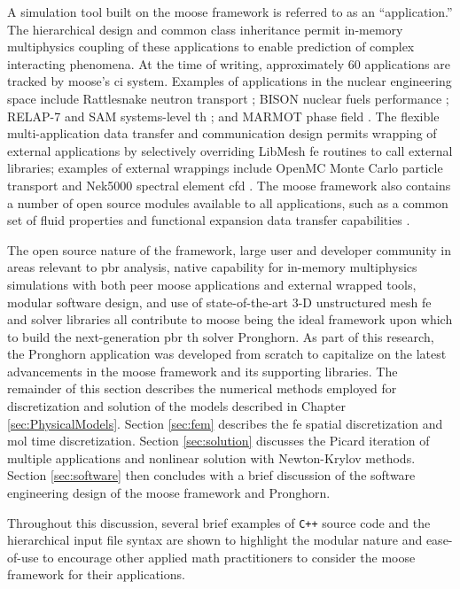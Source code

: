A simulation tool built on the \gls{moose} framework is referred to as an ``application.'' The hierarchical design and common class inheritance permit in-memory multiphysics coupling of these applications to enable prediction of complex interacting phenomena. At the time of writing, approximately 60 applications are tracked by \gls{moose}'s \gls{ci} system. Examples of applications in the nuclear engineering space include Rattlesnake neutron transport \cite{rattlesnake}; BISON nuclear fuels performance \cite{bison}; RELAP-7 and SAM systems-level \gls{th} \cite{relap7,hu}; and MARMOT phase field \cite{tonks}. The flexible multi-application data transfer and communication design permits wrapping of external applications by selectively overriding LibMesh \gls{fe} routines to call external libraries; examples of external wrappings include OpenMC Monte Carlo particle transport and Nek5000 spectral element \gls{cfd} \cite{romano, NEK5000, novak}. The \gls{moose} framework also contains a number of open source modules available to all applications, such as a common set of fluid properties and functional expansion data transfer capabilities \cite{wendt}. 

The open source nature of the framework, large user and developer community in areas relevant to \gls{pbr} analysis, native capability for in-memory multiphysics simulations with both peer \gls{moose} applications and external wrapped tools, modular software design, and use of state-of-the-art 3-D unstructured mesh \gls{fe} and solver libraries all contribute to \gls{moose} being the ideal framework upon which to build the next-generation \gls{pbr} \gls{th} solver Pronghorn. As part of this research, the Pronghorn application was developed from scratch to capitalize on the latest advancements in the \gls{moose} framework and its supporting libraries. The remainder of this section describes the numerical methods employed for discretization and solution of the models described in Chapter \ref{sec:PhysicalModels}. Section \ref{sec:fem} describes the \gls{fe} spatial discretization and \gls{mol} time discretization. Section \ref{sec:solution} discusses the Picard iteration of multiple applications and nonlinear solution with Newton-Krylov methods. Section \ref{sec:software} then concludes with a brief discussion of the software engineering design of the \gls{moose} framework and Pronghorn.

Throughout this discussion, several brief examples of \texttt{C++} source code and the hierarchical input file syntax are shown to highlight the modular nature and ease-of-use to encourage other applied math practitioners to consider the \gls{moose} framework for their applications. 

